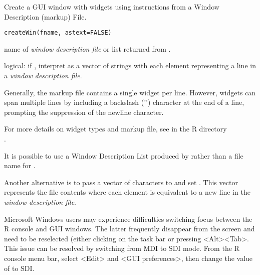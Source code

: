 \documentclass[letterpaper]{book}
\begin{document}
\begin{Description}\relax
Create a GUI window with widgets using instructions from a 
Window Description (markup) File.
\end{Description}
\begin{Usage}
\begin{verbatim}createWin(fname, astext=FALSE)\end{verbatim}
\end{Usage}
\begin{Arguments}
\begin{ldescription}
\item[\code{fname}] name of \emph{window description file} 
or list returned from .
\item[\code{astext}] logical: if , interpret  
as a vector of strings with each element representing a line 
in a \emph{window description file}.
\end{ldescription}
\end{Arguments}
\begin{Details}\relax
Generally, the markup file contains a single widget per line. However, widgets 
can span multiple lines by including a backslash ('\bsl{}') character at the end of 
a line, prompting the suppression of the newline character.

For more details on widget types and markup file, see  
in the R directory \\ .

It is possible to use a Window Description List produced by 
 rather than a file name for .

Another alternative is to pass a vector of characters to  and set 
. This vector represents the file contents where each element 
is equivalent to a new line in the \emph{window description file}.
\end{Details}
\begin{Note}\relax
Microsoft Windows users may experience difficulties switching focus between the 
R console and GUI windows. The latter frequently disappear from the screen and 
need to be reselected (either clicking on the task bar or pressing \textless{}Alt\textgreater{}\textless{}Tab\textgreater{}. 
This issue can be resolved by switching from MDI to SDI mode. From the R console 
menu bar, select \textless{}Edit\textgreater{} and \textless{}GUI preferences\textgreater{}, then change the value of 
 to SDI.
\end{Note}
\end{document}
